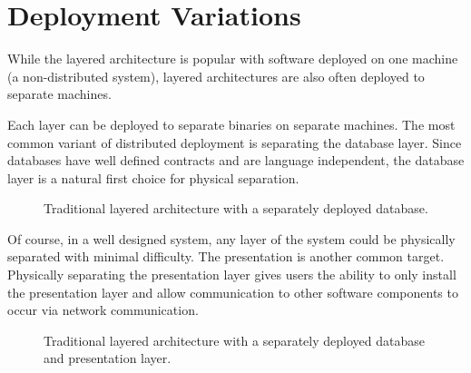 \section{Deployment Variations}

While the layered architecture is popular with software deployed on one machine (a non-distributed system),
layered architectures are also often deployed to separate machines.

Each layer can be deployed to separate binaries on separate machines.
The most common variant of distributed deployment is separating the database layer.
Since databases have well defined contracts and are language independent, the database layer is a natural first choice for physical separation.

\begin{figure}[ht]
    \centering
    \caption{Traditional layered architecture with a separately deployed database.}
    \label{fig:layered-db-separated}
\end{figure}

Of course, in a well designed system, any layer of the system could be physically separated with minimal difficulty.
The presentation is another common target.
Physically separating the presentation layer gives users the ability to only install the presentation layer and allow communication to
other software components to occur via network communication.

\begin{figure}[ht]
    \centering
    \caption{Traditional layered architecture with a separately deployed database and presentation layer.}
    \label{fig:layered-db-pres-separated}
\end{figure}

